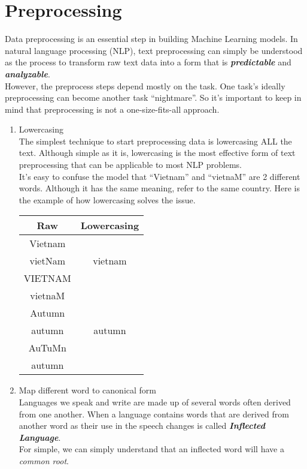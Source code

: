 \documentclass{article}
\begin{document}
\section{Preprocessing}
Data preprocessing is an essential step in building Machine Learning models. 
In natural language processing (NLP), text preprocessing can simply be understood as the process to transform raw text data into a form that is \emph{\textbf{predictable}} and \emph{\textbf{analyzable}}.\\
However, the preprocess steps depend mostly on the task. One task’s ideally preprocessing can become another task “nightmare”. 
So it’s important to keep in mind that preprocessing is not a one-size-fits-all approach.
\begin{enumerate}[label=2.\arabic*]
    \item Lowercasing \\
    The simplest technique to start preprocessing data is lowercasing ALL the text. Although simple as it is, lowercasing is the most effective form of text preprocessing that can be applicable to most NLP problems. \\
    It’s easy to confuse the model that “Vietnam” and “vietnaM” are 2 different words. Although it has the same meaning, refer to the same country. Here is the example of how lowercasing solves the issue.    
    \begin{center}
        \begin{tabular}{|c|c|}
            \hline 
            \textbf{Raw} & \textbf{Lowercasing} \\
            \hline
            Vietnam & \\
            vietNam & vietnam\\
            VIETNAM & \\
            vietnaM & \\
            \hline
            Autumn & \\
            autumn & autumn\\ 
            AuTuMn & \\ 
            autumn & \\
            \hline
        \end{tabular}
    \end{center}

    \item Map different word to canonical form \\
    Languages we speak and write are made up of several words often derived from one another.
    When a language contains words that are derived from another word as their use in the speech changes is called \emph{\textbf{Inflected Language}}.\\
    For simple, we can simply understand that an inflected word will have a \emph{common root}. 


\end{enumerate}
\end{document}
